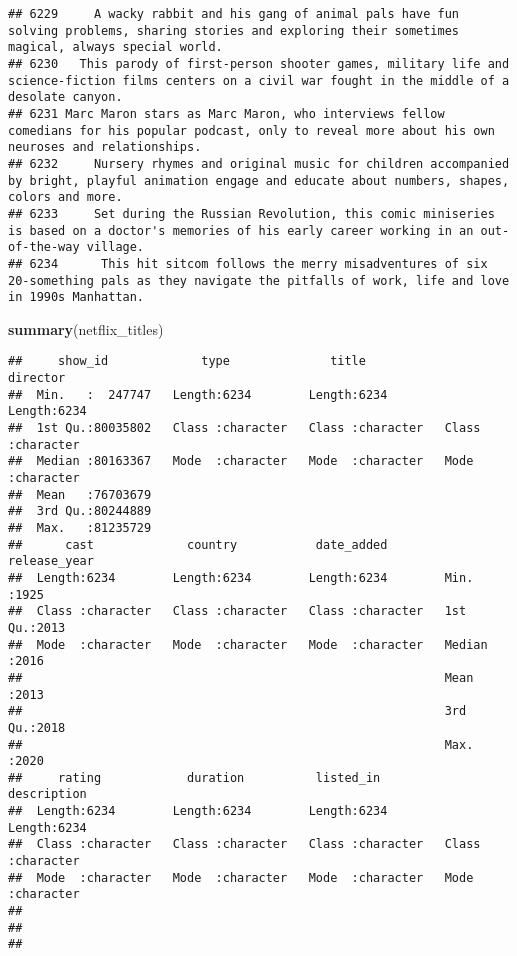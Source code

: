 \documentclass[
]{article}
\newenvironment{Shaded}{\begin{snugshade}}{\end{snugshade}}
\newcommand{\KeywordTok}[1]{\textcolor[rgb]{0.13,0.29,0.53}{\textbf{#1}}}
\newcommand{\NormalTok}[1]{#1}
\begin{document}
\begin{verbatim}
## 6229     A wacky rabbit and his gang of animal pals have fun solving problems, sharing stories and exploring their sometimes magical, always special world.
## 6230   This parody of first-person shooter games, military life and science-fiction films centers on a civil war fought in the middle of a desolate canyon.
## 6231 Marc Maron stars as Marc Maron, who interviews fellow comedians for his popular podcast, only to reveal more about his own neuroses and relationships.
## 6232     Nursery rhymes and original music for children accompanied by bright, playful animation engage and educate about numbers, shapes, colors and more.
## 6233     Set during the Russian Revolution, this comic miniseries is based on a doctor's memories of his early career working in an out-of-the-way village.
## 6234      This hit sitcom follows the merry misadventures of six 20-something pals as they navigate the pitfalls of work, life and love in 1990s Manhattan.
\end{verbatim}

\begin{Shaded}
\begin{Highlighting}[]
\KeywordTok{summary}\NormalTok{(netflix_titles)}
\end{Highlighting}
\end{Shaded}

\begin{verbatim}
##     show_id             type              title             director        
##  Min.   :  247747   Length:6234        Length:6234        Length:6234       
##  1st Qu.:80035802   Class :character   Class :character   Class :character  
##  Median :80163367   Mode  :character   Mode  :character   Mode  :character  
##  Mean   :76703679                                                           
##  3rd Qu.:80244889                                                           
##  Max.   :81235729                                                           
##      cast             country           date_added         release_year 
##  Length:6234        Length:6234        Length:6234        Min.   :1925  
##  Class :character   Class :character   Class :character   1st Qu.:2013  
##  Mode  :character   Mode  :character   Mode  :character   Median :2016  
##                                                           Mean   :2013  
##                                                           3rd Qu.:2018  
##                                                           Max.   :2020  
##     rating            duration          listed_in         description       
##  Length:6234        Length:6234        Length:6234        Length:6234       
##  Class :character   Class :character   Class :character   Class :character  
##  Mode  :character   Mode  :character   Mode  :character   Mode  :character  
##                                                                             
##                                                                             
## 
\end{verbatim}
\end{document}
